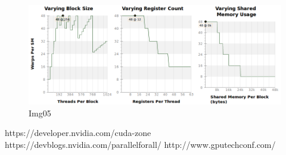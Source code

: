 \documentclass[a4paper]{article}
\begin{document}
\begin{figure}[ht]
    \centering
    \includegraphics[width=0.7\linewidth]{profiling/darker/darker_varying}
    \caption{Img05}
    \label{fig:img05Prof}
\end{figure}
\FloatBarrier

\printbibliography 

https://developer.nvidia.com/cuda-zone
https://devblogs.nvidia.com/parallelforall/
http://www.gputechconf.com/
\end{document}
